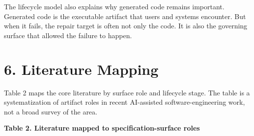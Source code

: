 \documentclass[
]{article}
\begin{document}
The lifecycle model also explains why generated code remains important.
Generated code is the executable artifact that users and systems
encounter. But when it fails, the repair target is often not only the
code. It is also the governing surface that allowed the failure to
happen.

\section{6. Literature Mapping}\label{literature-mapping}

Table 2 maps the core literature by surface role and lifecycle stage.
The table is a systematization of artifact roles in recent AI-assisted
software-engineering work, not a broad survey of the area.

\textbf{Table 2. Literature mapped to specification-surface roles}
\end{document}
